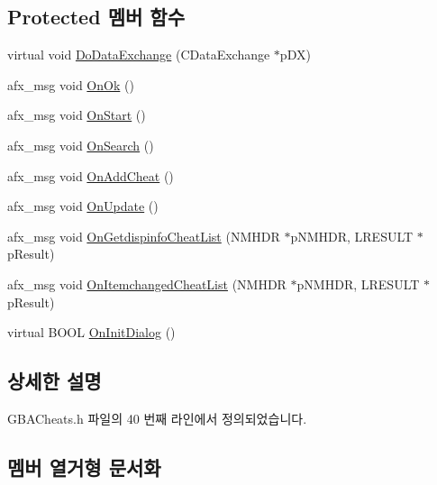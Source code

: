 \subsection*{Protected 멤버 함수}
\begin{DoxyCompactItemize}
\item 
virtual void \mbox{\hyperlink{class_g_b_a_cheat_search_aa72724b88600ea8391dba6f6cf085282}{Do\+Data\+Exchange}} (C\+Data\+Exchange $\ast$p\+DX)
\item 
afx\+\_\+msg void \mbox{\hyperlink{class_g_b_a_cheat_search_a6e17bbbf43d2a744853abfb00fa791ec}{On\+Ok}} ()
\item 
afx\+\_\+msg void \mbox{\hyperlink{class_g_b_a_cheat_search_a7c1882cbc31a995d42b02017af188353}{On\+Start}} ()
\item 
afx\+\_\+msg void \mbox{\hyperlink{class_g_b_a_cheat_search_a2b933c2b548983257f7e92da9bbb1695}{On\+Search}} ()
\item 
afx\+\_\+msg void \mbox{\hyperlink{class_g_b_a_cheat_search_ae1797b0166163a717a3f3dfa873c13e6}{On\+Add\+Cheat}} ()
\item 
afx\+\_\+msg void \mbox{\hyperlink{class_g_b_a_cheat_search_ac38fa782e7bb20f90f40e6605808f9fe}{On\+Update}} ()
\item 
afx\+\_\+msg void \mbox{\hyperlink{class_g_b_a_cheat_search_a6ad35822df234eb7d2db23435381577e}{On\+Getdispinfo\+Cheat\+List}} (N\+M\+H\+DR $\ast$p\+N\+M\+H\+DR, L\+R\+E\+S\+U\+LT $\ast$p\+Result)
\item 
afx\+\_\+msg void \mbox{\hyperlink{class_g_b_a_cheat_search_aa46092b07e72e992913262bc29546b2a}{On\+Itemchanged\+Cheat\+List}} (N\+M\+H\+DR $\ast$p\+N\+M\+H\+DR, L\+R\+E\+S\+U\+LT $\ast$p\+Result)
\item 
virtual B\+O\+OL \mbox{\hyperlink{class_g_b_a_cheat_search_a29ff71ddc116276ad183d91e93d69426}{On\+Init\+Dialog}} ()
\end{DoxyCompactItemize}


\subsection{상세한 설명}


G\+B\+A\+Cheats.\+h 파일의 40 번째 라인에서 정의되었습니다.



\subsection{멤버 열거형 문서화}
\mbox{\label{class_g_b_a_cheat_search_aad94fa4948a9a182e3d5a15c5d0bf02f}} 

